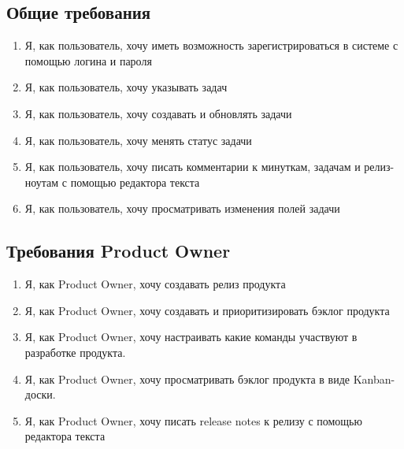 \documentclass[14pt,a4paper]{extarticle}
\begin{document}
\subsection{Общие требования}
\begin{enumerate}[label=\textbf{FR\arabic*}.]
	\item Я, как пользователь, хочу иметь возможность зарегистрироваться в системе с помощью логина и пароля
	\item Я, как пользователь, хочу указывать  задач
	\item Я, как пользователь, хочу создавать и обновлять задачи
	\item Я, как пользователь, хочу менять статус задачи
	\item Я, как пользователь, хочу писать комментарии к минуткам, задачам и релиз-ноутам с помощью редактора текста
	\item Я, как пользователь, хочу просматривать изменения полей задачи
\end{enumerate}

\subsection{Требования Product Owner}
\begin{enumerate}[label=\textbf{POR\arabic*}.]
	\item Я, как Product Owner, хочу создавать релиз продукта
	\item Я, как Product Owner, хочу создавать и приоритизировать бэклог продукта
	\item Я, как Product Owner, хочу настраивать какие команды участвуют в разработке продукта.
	\item Я, как Product Owner, хочу просматривать бэклог продукта в виде Kanban-доски.
	\item Я, как Product Owner, хочу писать release notes к релизу с помощью редактора текста
\end{enumerate}
\end{document}
